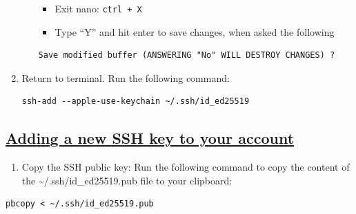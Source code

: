 \documentclass[
]{book}
\providecommand{\tightlist}{%
  \setlength{\itemsep}{0pt}\setlength{\parskip}{0pt}}
\theoremstyle{definition}
\theoremstyle{definition}
\theoremstyle{definition}
\theoremstyle{definition}
\theoremstyle{remark}
\begin{document}
\begin{enumerate}
\begin{enumerate}
    \begin{itemize}
    \tightlist
    \item
      Exit nano: \texttt{ctrl\ +\ X}
    \item
      Type ``Y'' and hit enter to save changes, when asked the following
    \end{itemize}

\begin{verbatim}
Save modified buffer (ANSWERING "No" WILL DESTROY CHANGES) ?
\end{verbatim}
  \end{enumerate}
\item
  Return to terminal. Run the following command:

\begin{verbatim}
ssh-add --apple-use-keychain ~/.ssh/id_ed25519
\end{verbatim}
\end{enumerate}

\subsection{\texorpdfstring{\href{https://docs.github.com/en/authentication/connecting-to-github-with-ssh/adding-a-new-ssh-key-to-your-github-account\#adding-a-new-ssh-key-to-your-account}{Adding a new SSH key to your account}}{Adding a new SSH key to your account}}\label{adding-a-new-ssh-key-to-your-account}

\begin{enumerate}
\def\labelenumi{\arabic{enumi}.}
\tightlist
\item
  Copy the SSH public key: Run the following command to copy the content of the \textasciitilde/.ssh/id\_ed25519.pub file to your clipboard:
\end{enumerate}

\begin{verbatim}
pbcopy < ~/.ssh/id_ed25519.pub
\end{verbatim}
\end{document}
